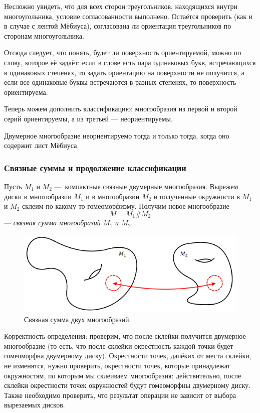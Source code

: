 Несложно увидеть, что для всех сторон треугольников, находящихся внутри многоугольника, условие согласованности выполнено. Остаётся проверить (как и в случае с лентой Мёбиуса), согласована ли ориентация треугольников по сторонам многоугольника.

Отсюда следует, что понять, будет ли поверхность ориентируемой, можно по слову, которое её задаёт: если в слове есть пара одинаковых букв, встречающихся в одинаковых степенях, то задать ориентацию на поверхности не получится, а если все одинаковые буквы встречаются в разных степенях, то поверхность ориентируема.

Теперь можем дополнить классификацию: многообразия из первой и второй серий ориентируемы, а из третьей — неориентируемы.

\begin{statement}
    Двумерное многообразие неориентируемо тогда и только тогда, когда оно содержит лист Мёбиуса.
\end{statement} 


\subsubsection{Связные суммы и продолжение классификации}
\begin{definition}
    Пусть $M_1$ и $M_2$ — компактные связные двумерные многообразия. Вырежем диски в многообразии $M_1$ и в многообразии $M_2$ и полученные окружности в $M_1$ и $M_2$ склеим по какому-то гомеоморфизму. Получим новое многообразие $$M = M_1 \# M_2$$ — \textit{связная сумма многообразий $M_1$ и $M_2$}.
\end{definition} 

\begin{figure}[ht]
    \centering
    \includegraphics[scale=0.8]{images/c11.9.png}
    \caption{Связная сумма двух многообразий.}
    \label{fig:c11.9}
\end{figure}

Корректность определения: проверим, что после склейки получится двумерное многообразие (то есть, что после склейки окрестность каждой точки будет гомеоморфна двумерному диску). Окрестности точек, далёких от места склейки, не изменятся, нужно проверить, окрестности точек, которые принадлежат окружностям, по которым мы склеиваем многообразия: действительно, после склейки окрестности точек окружностей будут гомеоморфны двумерному диску. Также необходимо проверить, что результат операции не зависит от выбора вырезаемых дисков.


